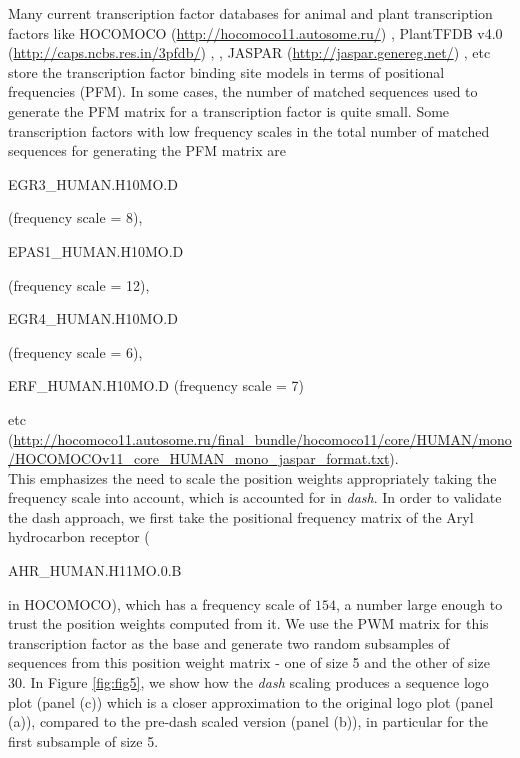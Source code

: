 \documentclass{bmcart}
\begin{document}
Many current transcription factor databases for animal and plant transcription factors like HOCOMOCO (\url{http://hocomoco11.autosome.ru/}) \cite{Kulakovskiy2013} \cite{Kulakovskiy2016}, PlantTFDB  v4.0 (\url{http://caps.ncbs.res.in/3pfdb/}) \cite{Jin2015}, \cite{Jin2017} \cite{Jin2014}, JASPAR (\url{http://jaspar.genereg.net/}) \cite{Sandelin2004}, \cite{Mathelier2014} etc store the transcription factor binding site models in terms of positional frequencies (PFM). In some cases, the number of matched sequences used to generate the PFM matrix for a transcription factor is quite small.  Some transcription factors with low frequency scales in the total number of matched sequences for generating the PFM matrix are  \begin{verb} EGR3_HUMAN.H10MO.D \end{verb} (frequency scale = 8), \begin{verb} EPAS1_HUMAN.H10MO.D \end{verb} (frequency scale = 12), \begin{verb} EGR4_HUMAN.H10MO.D \end{verb} (frequency scale = 6), \begin{verb} ERF_HUMAN.H10MO.D (frequency scale = 7) \end{verb} etc (\url{http://hocomoco11.autosome.ru/final_bundle/hocomoco11/core/HUMAN/mono/HOCOMOCOv11_core_HUMAN_mono_jaspar_format.txt}). \\ [3 pt]

This emphasizes the need to scale the position weights appropriately taking the frequency scale into account, which is accounted for in \textit{dash}. In order to validate the dash approach, we first take the positional frequency matrix of the Aryl hydrocarbon receptor (\begin{verb} AHR_HUMAN.H11MO.0.B \end{verb} in HOCOMOCO), which has a frequency scale of $154$, a number large enough to trust the position weights computed from it. We use the PWM matrix for this transcription factor as the base and generate two random subsamples of sequences from this position weight matrix - one of size 5 and the other of size 30. In Figure \ref{fig:fig5}, we show how the \textit{dash} scaling produces a sequence logo plot (panel (c)) which is a closer approximation to the original logo plot (panel (a)), compared to the pre-dash scaled version (panel (b)), in particular for the first subsample of size 5. \\ [3 pt]
\end{document}
